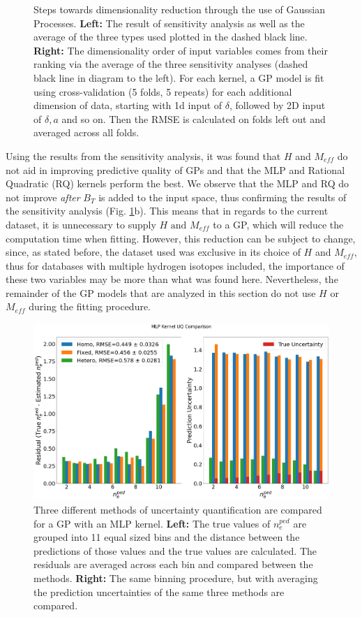 \documentclass[a4paper, twoside, final, 12pt]{article}
\begin{document}
{\begin{figure}
\begin{subfigure}{0.48\linewidth}
	\end{subfigure}
	\caption{Steps towards dimensionality reduction through the use of Gaussian Processes. \textbf{Left:} The result of sensitivity analysis as well as the average of the three types used plotted in the dashed black line. \textbf{Right:} The dimensionality order of input variables comes from their ranking via the average of the three sensitivity analyses (dashed black line in diagram to the left). For each kernel, a GP model is fit using cross-validation (5 folds, 5 repeats) for each additional dimension of data, starting with 1d input of $\delta$, followed by 2D input of $\delta, a$ and so on. Then the RMSE is calculated on folds left out and averaged across all folds. } \label{fig:GP_dim}
\end{figure}

Using the results from the sensitivity analysis, it was found that $H$ and $M_{eff}$ do not aid in improving predictive quality of GPs and that the MLP and Rational Quadratic (RQ) kernels perform the best.  We observe that the MLP and RQ do not improve \textit{after} $B_T$ is added to the input space, thus confirming the results of the sensitivity analysis (Fig. \ref{fig:GP_dim}b). This means that in regards to the current dataset, it is unnecessary to supply $H \text{ and } M_{eff}$ to a GP, which will reduce the computation time when fitting. However, this reduction can be subject to change, since, as stated before, the dataset used was exclusive in its choice of $H$ and $M_{eff}$, thus for databases with multiple hydrogen isotopes included, the importance of these two variables may be more than what was found here. Nevertheless, the remainder of the GP models that are analyzed in this section do not use $H$ or $M_{eff}$ during the fitting procedure. 

\begin{figure}[H]\centering
		\includegraphics[scale=0.25]{./src/MLP_uq_compare}
		\caption{Three different methods of uncertainty quantification are compared for a GP with an MLP kernel. \textbf{Left:} The true values of $n_e^{ped}$ are grouped into 11 equal sized bins and the distance between the predictions of those values and the true values are calculated. The residuals are averaged across each bin and compared between the methods. \textbf{Right:} The same binning procedure, but with averaging the prediction uncertainties of the same three methods are compared.}
	\label{fig:MLP_UQ}
\end{figure}

}
\end{document}
